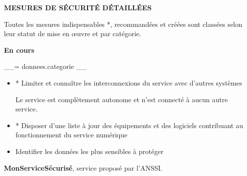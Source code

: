 \documentclass[9pt, a4paper]{article}
\begin{document}
  \textbf{MESURES DE SÉCURITÉ DÉTAILLÉES}

  \textcolor{gris}{Toutes les mesures indispensables *, recommandées et créées sont classées selon
  leur statut de mise en œuvre et par catégorie.}

  \vskip 0.5cm

  \textbf{En cours}

  \begin{tcolorbox}[colback=white, colframe=lisere, boxrule=1px]
    \textcolor{bleu}{__= donnees.categorie __}
    \begin{itemize}
      \item * Limiter et connaître les interconnexions du service avec d'autres systèmes

        \textcolor{gris}{Le service est complètement autonome et n'est connecté à aucun autre
        service.}
      \item * Disposer d'une liste à jour des équipements et des logiciels contribuant au
        fonctionnement du service numérique
      \item Identifier les données les plus sensibles à protéger
    \end{itemize}
  \end{tcolorbox}

  \vskip 1cm

  \textcolor{bleu}{\textbf{MonServiceSécurisé}}, service proposé par l'ANSSI.
\end{document}

